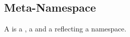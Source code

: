 \subsection{Meta-Namespace}
\label{concept-Meta-Namespace}

A  is a , a  and a 
reflecting a namespace.



